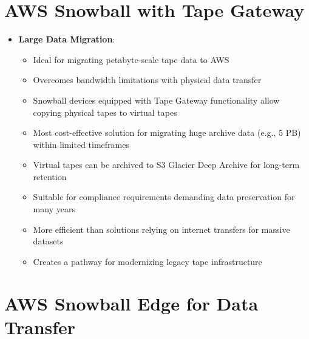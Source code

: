 \documentclass[11pt,a4paper]{report}
\begin{document}
\section{AWS Snowball with Tape Gateway}

\begin{itemize}
  \item \textbf{Large Data Migration}:
\begin{itemize}
  \item Ideal for migrating petabyte-scale tape data to AWS
  \item Overcomes bandwidth limitations with physical data transfer
  \item Snowball devices equipped with Tape Gateway functionality allow copying physical tapes to virtual tapes
  \item Most cost-effective solution for migrating huge archive data (e.g., 5 PB) within limited timeframes
  \item Virtual tapes can be archived to S3 Glacier Deep Archive for long-term retention
  \item Suitable for compliance requirements demanding data preservation for many years
  \item More efficient than solutions relying on internet transfers for massive datasets
  \item Creates a pathway for modernizing legacy tape infrastructure
\end{itemize}
\end{itemize}


\section{AWS Snowball Edge for Data Transfer}
\end{document}
